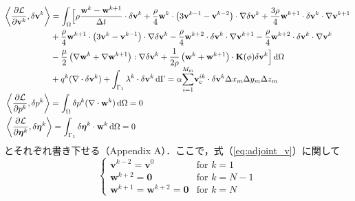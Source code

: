 \begin{align}
    &\begin{aligned}
        \label{eq:adjoint_v}
        \left\langle\frac{\partial \mathcal{L}}{\partial \mathbf{v}^k}, \delta \mathbf{v}^k\right\rangle
        & = \int_{\Omega} \Bigl[ \rho\frac{\mathbf{w}^{k} - \mathbf{w}^{k+1}}{\Delta t} \cdot \delta \mathbf{v}^k
        + \frac{\rho}{4} \mathbf{w}^{k} \cdot \left( 3\mathbf{v}^{k-1} - \mathbf{v}^{k-2} \right) \cdot \nabla \delta \mathbf{v}^{k}
        + \frac{3\rho}{4} \mathbf{w}^{k+1} \cdot \delta \mathbf{v}^k \cdot \nabla \mathbf{v}^{k+1} \\ 
        & + \frac{\rho}{4} \mathbf{w}^{k+1} \cdot \left( 3\mathbf{v}^k - \mathbf{v}^{k-1} \right) \cdot \nabla \delta \mathbf{v}^{k}
        - \frac{\rho}{4} \mathbf{w}^{k+2} \cdot \delta \mathbf{v}^{k} \cdot \nabla \mathbf{v}^{k+1} 
        - \frac{\rho}{4}  \mathbf{w}^{k+2} \cdot \delta \mathbf{v}^{k} \cdot \nabla \mathbf{v}^{k} \\
        & - \frac{\mu}{2} \left(\nabla \mathbf{w}^{k} + \nabla \mathbf{w}^{k+1}\right) : \nabla \delta \mathbf{v}^k
        + \frac{1}{2\rho} \left(\mathbf{w}^{k} + \mathbf{w}^{k+1}\right) \cdot \mathbf{K}(\phi) \delta \mathbf{v}^k 
        \Bigr] \, \mathrm{d}\Omega \\
        & + q^{k} (\nabla \cdot \delta \mathbf{v}^{k}) 
        + \int_{\Gamma_1} \lambda^{k} \cdot \delta \mathbf{v}^{k} \, \mathrm{d}\Gamma
        = \alpha \smash{\sum_{i=1}^{M_\text{m}}}
        \mathbf{v}^{ik}_{\mathrm{e}}
        \cdot \delta \mathbf{v}^k 
        \Delta x_m \Delta y_m \Delta z_m 
    \end{aligned} \\
    \label{eq:adjoint_p} 
    & \left\langle\frac{\partial \mathcal{L}}{\partial p^k}, \delta p^k\right\rangle
    =\int_{\Omega} \delta p^k(\nabla \cdot \mathbf{w}^{k}) \, \mathrm{d}\Omega 
    = 0 \\
    \label{eq:adjoint_eta} 
    &\left\langle\frac{\partial \mathcal{L}}{\partial \boldsymbol{\eta}^k}, \delta \boldsymbol{\eta}^k\right\rangle
    =\int_{\Gamma_1} \delta \boldsymbol{\eta}^k \cdot \mathbf{w}^k \, \mathrm{d}\Omega 
    = 0
\end{align}
とそれぞれ書き下せる（Appendix A）．ここで，式（\ref{eq:adjoint_v}）に関して
\begin{equation}
    \label{eq:adjoint_eq_condition}
    \begin{cases}
        \displaystyle \mathbf{v}^{k-2} = \mathbf{v}^{0} & \text{for } k=1 \\
        \displaystyle \mathbf{w}^{k+2} = \mathbf{0} & \text{for } k=N-1 \\
        \displaystyle \mathbf{w}^{k+1} = \mathbf{w}^{k+2} = \mathbf{0} & \text{for } k=N
    \end{cases}
\end{equation}
